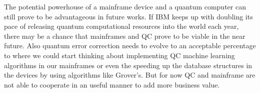 \documentclass[a0,portrait]{a0poster}
\begin{document}
\begin{multicols}{2}
The potential powerhouse of a mainframe device and a quantum computer can still prove
to be advantageous in future works. If IBM keeps up with doubling its pace of releasing
quantum computational resources into the world each year, there may be a chance that
mainframes and QC prove to be viable in the near future. Also quantum error correction
needs to evolve to an acceptable percentage to where we could start thinking about
implementing QC machine learning algorithms in our mainframes or even the speeding up
the database structures in the devices by using algorithms like Grover’s. But for now QC
and mainframe are not able to cooperate in an useful manner to add more business value.



\end{multicols}
\end{document}
